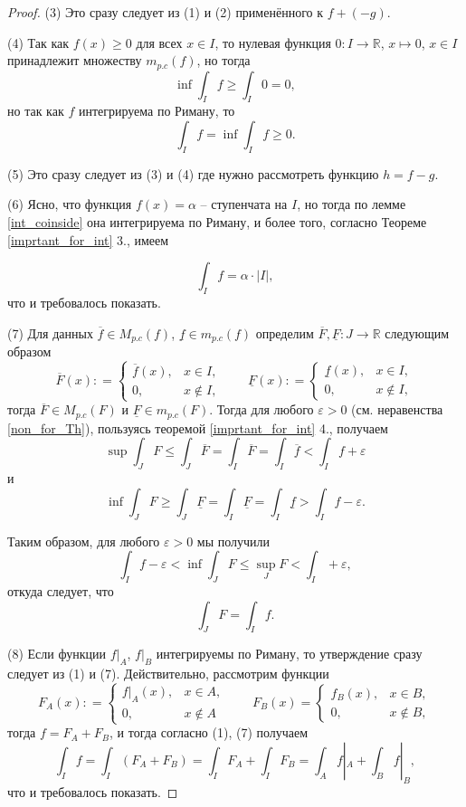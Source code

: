 \begin{proof}
(3) Это сразу следует из (1) и (2) применённого к $f+(-g)$.

(4) Так как $f(x) \ge 0$ для всех $x \in I$, то нулевая функция $0:I \to \mathbb{R}$, $x \mapsto 0$, $x\in I$ принадлежит множеству $m_{p.c}(f)$, но тогда
\[
 \inf \int_I f \ge \int_I 0 = 0,
\]
но так как $f$ интегрируема по Риману, то
\[
 \int_I f = \inf \int_I f \ge 0.
\]

(5) Это сразу следует из (3) и (4) где нужно рассмотреть функцию $h = f-g.$

(6) Ясно, что функция $f(x) =\alpha$ -- ступенчата на $I$, но тогда по лемме \ref{int_coinside} она интегрируема по Риману, и более того, согласно Теореме \ref{imprtant_for_int} 3., имеем

\[
 \int_I f = \alpha \cdot |I|,
\]
что и требовалось показать.

(7) Для данных $\overline{f}\in M_{p.c}(f)$, $\underline{f} \in m_{p.c}(f)$  определим $\overline{F}, \underline{F}:J \to \mathbb{R}$ следующим образом
\[
 \overline{F}(x): = \begin{cases}
     \overline{f}(x), & x \in I,\\
     0, & x\notin I,
 \end{cases} \qquad  \underline{F}(x): = \begin{cases}
     \underline{f}(x), & x \in I,\\
     0, & x\notin I,
 \end{cases}
\]
тогда $\overline{F}\in M_{p.c}(F)$ и $\underline{F} \in m_{p.c}(F)$. Тогда для любого $\varepsilon>0$ (см. неравенства \ref{non_for_Th}), пользуясь теоремой \ref{imprtant_for_int} 4., получаем
\[
 \sup \int_J F \le \int_J \overline{F} = \int_I \overline{F} = \int_I \overline{f}< \int_I f + \varepsilon
\]
и
\[
 \inf \int_J F \ge \int_J \underline{F} = \int_I \underline{F} = \int_I \underline{f} > \int_I f -\varepsilon.
\]

Таким образом, для любого $\varepsilon>0$ мы получили
\[
 \int_I f - \varepsilon < \inf \int_J F \le \sup_J F < \int_I + \varepsilon,
\]
откуда следует, что
\[
 \int_J F = \int_I f.
\]

(8) Если функции $f|_A$, $f|_B$ интегрируемы по Риману, то утверждение сразу следует из (1) и (7). Действительно, рассмотрим функции 
\[
 F_A(x): = \begin{cases}
     f|_A(x), & x \in A,\\
     0, & x \notin A
 \end{cases} \qquad F_B(x) = \begin{cases}
     f_B(x), & x \in B,\\
     0, & x \notin B,
 \end{cases}
\]
тогда $f = F_A + F_B$, и тогда согласно (1), (7) получаем
\[
 \int_I f = \int_I(F_A + F_B) = \int_I F_A  + \int_I F_B = \int_A f|_A + \int_B f|_B,
\]
что и требовалось показать.


\end{proof}
